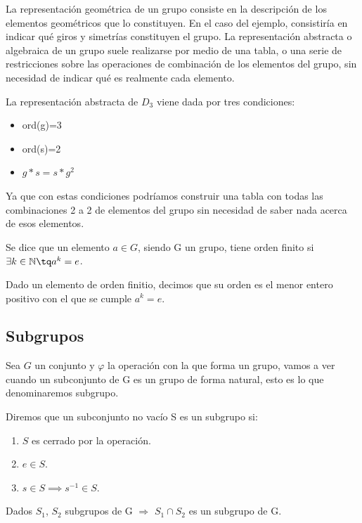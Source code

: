 \documentclass[a4paper,10pt]{apuntes}
\begin{document}
 La representación geométrica de un grupo consiste en la descripción de los elementos geométricos que lo constituyen. En el 
 caso del ejemplo, consistiría en indicar qué giros y simetrías constituyen el grupo.
 La representación abstracta o algebraica de un grupo suele realizarse por medio de una tabla, o una serie de restricciones sobre las operaciones
 de combinación de los elementos del grupo, sin necesidad de indicar qué es realmente cada elemento.
 \begin{example}
  La representación abstracta de $D_{3}$  viene dada por tres condiciones:
 \begin{itemize}
  \item ord(g)=3
  \item ord(s)=2
  \item $g*s=s*g^{2}$
 \end{itemize}
 Ya que con estas condiciones podríamos construir una tabla con todas las combinaciones 2 a 2 de elementos del grupo sin necesidad
 de saber nada acerca de esos elementos.
 \end{example}
 
 \begin{defn}
  Se dice que un elemento $a\in G$, siendo G un grupo, tiene orden finito si $\exists k\in\mathbb{N} \tq  a^{k}=e$.
 \end{defn}
 
 \begin{defn}[Orden]
  Dado un elemento de orden finitio, decimos que su orden es el menor entero positivo con el que se cumple $a^{k}=e$.
 \end{defn}
\subsection{Subgrupos}
 Sea $G$ un conjunto y $\varphi$  la operación con la que forma un grupo, vamos a ver cuando un subconjunto de G es un grupo de forma natural,
 esto es lo que denominaremos subgrupo.
 
 \begin{defn}[Subconjunto]
  Diremos que un subconjunto no vacío S es un subgrupo si:
  \begin{enumerate}
   \item $S$ es cerrado por la operación.
   \item $e \in S$.
   \item $s \in S \implies s^{-1}\in S$.
  \end{enumerate}
 \end{defn}
  \begin{theorem}
   Dados $S_{1}$, $S_{2}$ subgrupos de G $\Rightarrow$  $S_{1}\cap S_{2}$  es un subgrupo de G.
  \end{theorem}
\end{document}
